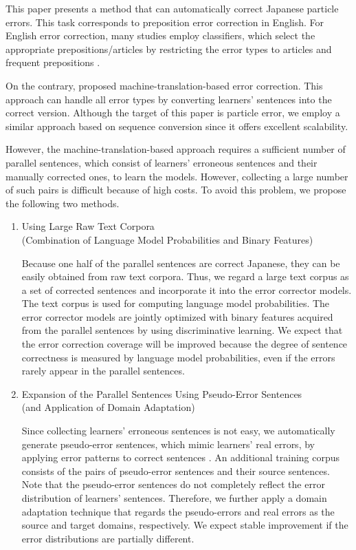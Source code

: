 \documentclass[english]{jnlp_1.4_rep}
\begin{document}
This paper presents a method that can automatically correct Japanese
particle errors. This task corresponds to preposition error correction
in English. For English error correction, many studies employ
classifiers, which select the appropriate prepositions/articles by
restricting the error types to articles and frequent prepositions
\cite{gamon:2010:NAACLHLT,HAN10.821,rozovskaya-roth:2011:ACL-HLT2011}.

On the contrary,  proposed
machine-translation-based error correction. This approach can handle
all error types by converting learners' sentences into the correct
version. Although the target of this paper is particle error, we
employ a similar approach based on sequence conversion
\cite{Imamura:MorphTrans2011} since it offers excellent
scalability.


However, the machine-translation-based approach requires a sufficient
number of parallel sentences, which consist of learners' erroneous
sentences and their manually corrected ones, to learn the
models. However, collecting a large number of such pairs is difficult
because of high costs. To avoid this problem, we propose the following
two methods.


\begin{enumerate}

\item Using Large Raw Text Corpora \\
(Combination of Language Model Probabilities and Binary Features)

Because one half of the parallel sentences are correct Japanese, they
can be easily obtained from raw text corpora. Thus, we regard a large
text corpus as a set of corrected sentences and incorporate it into
the error corrector models. The text corpus is used for computing
language model probabilities. The error corrector models are jointly
optimized with binary features acquired from the parallel sentences by
using discriminative learning. We expect that the error correction
coverage will be improved because the degree of sentence correctness
is measured by language model probabilities, even if the errors rarely
appear in the parallel sentences.

\item Expansion of the Parallel Sentences Using Pseudo-Error Sentences \\
(and Application of Domain Adaptation)

Since collecting learners' erroneous sentences is not easy, we
automatically generate pseudo-error sentences, which mimic learners'
real errors, by applying error patterns to correct sentences
. An additional training
corpus consists of the pairs of pseudo-error sentences and their
source sentences. Note that the pseudo-error sentences do not
completely reflect the error distribution of learners'
sentences. Therefore, we further apply a domain adaptation technique
that regards the pseudo-errors and real errors as the source and
target domains, respectively. We expect stable improvement if the
error distributions are partially different.

\end{enumerate}
\end{document}

